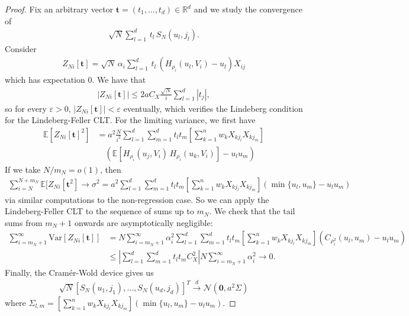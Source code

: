 \documentclass[11pt,a4paper]{article}
\newcommand{\E}{\mathbb{E}}
\begin{document}
\begin{appendices}
\begin{proof}
    Fix an arbitrary vector $\mathbf{t} = (t_{1},\ldots, t_{d}) \in \mathbb{R}^{d}$ and we study the convergence of
\begin{align*}
     \sqrt{N}\sum_{l=1}^d \, t_l \, S_N(u_l,j_l).
\end{align*}
Consider
\begin{align*}
    Z_{Ni}[\mathbf{t}] = \sqrt{N}\,\alpha_{i} \sum_{l=1}^d \, t_l \, (H_{\rho_{i}}(u_l,V_{i})-u_{l})X_{ij}
\end{align*}
which has expectation $0$. We have that
\begin{align*}
    |Z_{Ni}[\mathbf{t}]| \leq 2aC_{X}\frac{\sqrt{N}}{i}\sum_{l=1}^d  |t_j |,
\end{align*}
so for every $\varepsilon > 0$, $|Z_{Ni}[\mathbf{t}]| <\varepsilon$ eventually, which verifies the Lindeberg condition for the Lindeberg-Feller CLT. For the limiting variance, we first have
\begin{align*}
   \E[Z_{Ni}[\mathbf{t}]^2] &= a^2 \frac{N}{i^{2}} \sum_{l=1}^d \sum_{m = 1}^d t_l t_m \left[\sum_{k=1}^{n}w_{k}X_{kj_l}X_{kj_m}\right]\\
    &\quad \left(\E\left[H_{\rho_{i}}(u_j,V_{i})\, H_{\rho_{i}}(u_k,V_{i})\right] - u_{l}u_{m}\right)
\end{align*}
If we take $N/m_{N} = o(1)$, then
\begin{align*}
    \sum_{i=N}^{N+m_{N}}\E[Z_{Ni}[\mathbf{t}^2] \to \sigma^2 =  a^2  \sum_{l=1}^d \sum_{m = 1}^d t_l t_m \left[\sum_{k=1}^{n}w_{k}X_{kj_l}X_{kj_m}\right]\left(\min\{u_{l},u_{m}\} - u_{l}u_{m}\right)
\end{align*}
via similar computations to the non-regression case. So we can apply the Lindeberg-Feller CLT to the sequence of sums up to $m_{N}$. We check that the tail sums from $m_{N}+1$ onwards are asymptotically negligible: 
\begin{align*}
    \sum_{i = m_{N}+1}^{\infty} \text{Var}[Z_{Ni}[\mathbf{t}]] &= N \sum_{i =  m_{N} + 1}^\infty \alpha_{i}^2 \sum_{l=1}^d \sum_{m = 1}^d t_l t_m \left[\sum_{k=1}^{n}w_{k}X_{kj_l}X_{kj_m}\right] \left(C_{\rho_{i}^{2}}(u_l,u_m) - u_l u_m\right)\\
    & \leq \left|\sum_{l=1}^d \sum_{m = 1}^d t_l t_m C_{X}^{2}\right| N \sum_{i = m_{N} + 1}^\infty \alpha_{i}^2 \to 0.
\end{align*}
Finally, the Cram\'{e}r-Wold device gives us
\begin{align*}
    \sqrt{N}[S_{N}(u_{1},j_{1}), \ldots, S_{N}(u_{d},j_{d})]^{T} \overset{d}{\to} \mathcal{N}(\mathbf{0}, a^2 \Sigma)
\end{align*}
where $    \Sigma_{l,m} = \left[\sum_{k=1}^{n}w_{k}X_{kj_l}X_{kj_m}\right](\min\{u_l,u_m\} - u_l u_m)$.
\end{proof}


\end{appendices}
\end{document}

